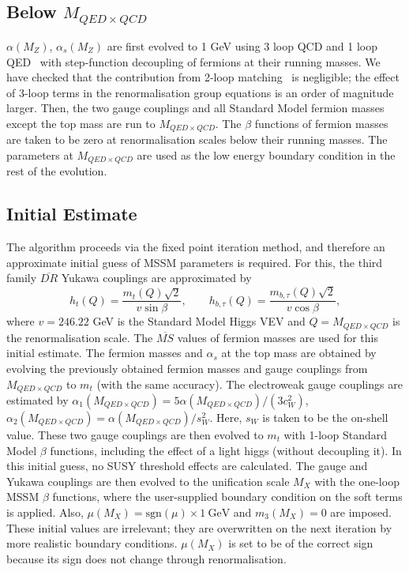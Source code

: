 \documentclass{article}
\def\gev{~\mbox{GeV}}
\begin{document}
\subsection{Below $M_{QED\times QCD}$}

$\alpha(M_Z)$, $\alpha_s(M_Z)$ are first evolved to 1 GeV using 3 loop QCD and
1 loop QED~\cite{Gorishnii:1990zu,Tarasov:1980au,Gorishnii:1984zi} with
step-function decoupling of fermions at their running masses.
We have checked that the contribution from 2-loop
matching~\cite{Chetyrkin:1997sg} is negligible; the effect of 3-loop terms in
the renormalisation group equations
is an order of magnitude larger.
Then, the two gauge couplings and all Standard Model fermion masses except
the top mass are run to $M_{QED \times QCD}$. The $\beta$ functions of fermion
masses are 
taken to be zero at renormalisation scales below their running masses.
The parameters at $M_{QED \times QCD}$ are used as the low energy boundary condition in the
rest of the evolution.

\subsection{Initial Estimate}

The algorithm proceeds via the fixed point iteration method, and therefore an
approximate 
initial guess of MSSM parameters is required. 
For this, the third family $\overline{DR}$ Yukawa couplings are approximated
by 
\begin{equation}
h_t(Q) = \frac{m_t(Q) \sqrt{2}}{v \sin \beta}, \qquad
h_{b,\tau}(Q) = \frac{m_{b,\tau}(Q) \sqrt{2}}{v \cos \beta},
\end{equation}
where $v=246.22$ GeV is the Standard Model Higgs VEV and
$Q=M_{QED\times QCD}$ is the renormalisation scale.
The $\overline{MS}$ values of fermion masses are used for this initial
estimate. 
The fermion masses and $\alpha_s$
at the top mass are obtained by evolving the previously
obtained fermion masses and gauge couplings from $M_{QED \times QCD}$ to $m_t$ (with the same
accuracy). 
The electroweak gauge couplings are estimated by $\alpha_1(M_{QED \times QCD})
= 5 \alpha(M_{QED \times QCD}) / (3 c_W^2)$, $\alpha_2(M_{QED \times QCD}) = \alpha(M_{QED \times QCD}) / s_W^2$. Here,
$s_W$ is taken to be the on-shell value. These two gauge couplings are then
evolved 
to $m_t$ with 1-loop Standard Model $\beta$ functions, including the effect of
a light higgs (without decoupling it). In this initial guess, no SUSY
threshold effects are calculated. The gauge and Yukawa couplings are then
evolved to the unification scale $M_X$ with the one-loop MSSM $\beta$
functions, where the user-supplied boundary 
condition on the soft terms is applied. 
Also, $\mu(M_X) =
\mbox{sgn}(\mu)\times1\gev$ and $m_3(M_X)=0$ are imposed. 
These initial values are irrelevant; they are overwritten on the next
iteration by more realistic boundary conditions.
$\mu(M_X)$ is set to be of the correct sign
because its sign does not change through renormalisation. 
\end{document}
